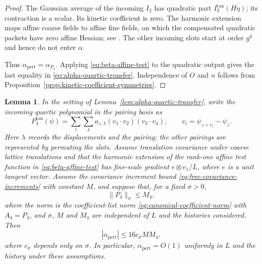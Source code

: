 \documentclass[11pt]{article}
\numberwithin{equation}{section}
\newtheorem{lemma}[theorem]{Lemma}
\theoremstyle{definition}
\theoremstyle{plain}
\begin{document}
\begin{proof}
The Gaussian average of the incoming $I_2$ has quadratic part
$I_2^{\mathrm{tan}}(H\eta)$; its contraction is a scalar.
Its kinetic coefficient is zero.  The harmonic extension maps affine
coarse fields to affine fine fields, on which the compensated
quadratic packets have zero affine Hessian; see
\cite[Section~5.5]{OpenAI-O3}.  The other incoming slots start at
order $g^4$ and hence do not enter $\alpha$.

Thus $\alpha_{\mathrm{pert}}=\alpha_{P_4}$.  Applying
\eqref{eq:beta-affine-test} to the quadratic output gives the
last equality in \eqref{eq:alpha-quartic-transfer}.
Independence of $O$ and $n$ follows from
Proposition~\ref{prop:kinetic-coefficient-symmetries}.
\end{proof}


\begin{lemma}
\label{lem:pert-uniform-bound}
In the setting of Lemma~\ref{lem:alpha-quartic-transfer}, write
the incoming quartic polynomial in the pairing basis as
\begin{equation}
 P_4^{\mathrm{tan}}(\psi)
 =\sum_z\sum_\lambda a_{z,\lambda}
       (v_1\cdot v_2)(v_3\cdot v_4),
 \qquad v_i=\psi_{z+r_i}-\psi_z.
 \label{eq:pert-quartic-pairing-list}
\end{equation}
Here $\lambda$ records the displacements and the pairing;
the other pairings are represented by permuting the slots.
Assume translation covariance under coarse lattice translations
and that the harmonic extension of the rank-one affine test
function in \eqref{eq:beta-affine-test} has fine-scale gradient
$e\otimes e_1/L$, where $e$ is a unit tangent vector.
Assume the covariance increment bound
\eqref{eq:free-covariance-increments} with constant $M$,
and suppose that, for a fixed $\sigma>0$,
\begin{equation}
 \|P_4\|_\sigma\le M_4,
 \label{eq:pert-uniform-assumptions}
\end{equation}
where the norm is the coefficient-list norm
\eqref{eq:canonical-coefficient-norm} with $A_4=P_4$,
and $\sigma$, $M$ and $M_4$ are independent of $L$ and the
histories considered.
Then
\begin{equation}
 |\alpha_{\mathrm{pert}}|\le 16c_\sigma MM_4,
 \label{eq:pert-uniform-bound}
\end{equation}
where $c_\sigma$ depends only on $\sigma$.
In particular, $\alpha_{\mathrm{pert}}=O(1)$ uniformly in
$L$ and the history under these assumptions.
\end{lemma}
\end{document}
